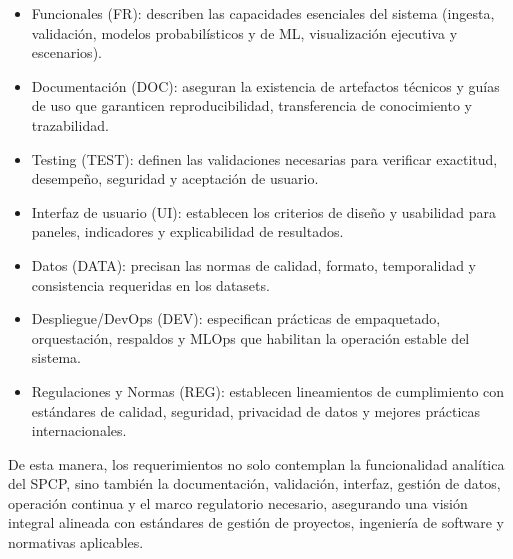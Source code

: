 \documentclass[12pt]
{charter}
\begin{document}
\begin{itemize}
  \item Funcionales (FR): describen las capacidades esenciales del sistema (ingesta, validación, modelos probabilísticos y de ML, visualización ejecutiva y escenarios).
  \item Documentación (DOC): aseguran la existencia de artefactos técnicos y guías de uso que garanticen reproducibilidad, transferencia de conocimiento y trazabilidad.
  \item Testing (TEST): definen las validaciones necesarias para verificar exactitud, desempeño, seguridad y aceptación de usuario.
  \item Interfaz de usuario (UI): establecen los criterios de diseño y usabilidad para paneles, indicadores y explicabilidad de resultados.
  \item Datos (DATA): precisan las normas de calidad, formato, temporalidad y consistencia requeridas en los datasets.
  \item Despliegue/DevOps (DEV): especifican prácticas de empaquetado, orquestación, respaldos y MLOps que habilitan la operación estable del sistema.
  \item Regulaciones y Normas (REG): establecen lineamientos de cumplimiento con estándares de calidad, seguridad, privacidad de datos y mejores prácticas internacionales.
\end{itemize}

De esta manera, los requerimientos no solo contemplan la funcionalidad analítica del SPCP, sino también la documentación, validación, interfaz, gestión de datos, operación continua y el marco regulatorio necesario, asegurando una visión integral alineada con estándares de gestión de proyectos, ingeniería de software y normativas aplicables.
\end{document}
